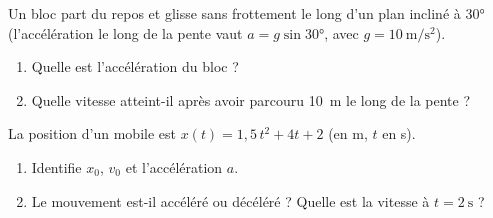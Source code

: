 \documentclass[11pt,a4paper]{article}
\begin{document}
\begin{exo}
Un bloc part du repos et glisse sans frottement le long d'un plan incliné à \ang{30}
(l'accélération le long de la pente vaut $a=g\sin\ang{30}$, avec $g=\qty{10}{\metre\per\second\squared}$).
\begin{center}
\end{center}
\begin{enumerate}[label=\alph*)]
  \item Quelle est l'accélération du bloc ?
  \item Quelle vitesse atteint-il après avoir parcouru \qty{10}{\metre} le long de la pente ?
\end{enumerate}
\end{exo}

\begin{exo}
La position d'un mobile est $x(t)=1{,}5\,t^2+4t+2$ (en \si{\metre}, $t$ en \si{\second}).
\begin{enumerate}[label=\alph*)]
  \item Identifie $x_0$, $v_0$ et l'accélération $a$.
  \item Le mouvement est-il accéléré ou décéléré ? Quelle est la vitesse à $t=\qty{2}{\second}$ ?
\end{enumerate}
\end{exo}
\end{document}
